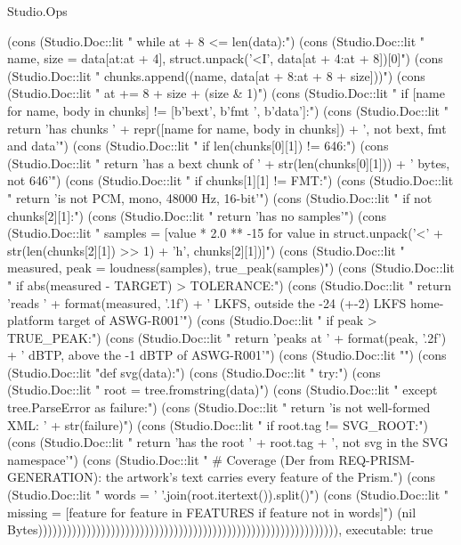 \begin{lexlean}{Studio.Ops}
\begin{semanticmodule}
{{    (cons (Studio.Doc::lit "    while at + 8 <= len(data):\n")
    (cons (Studio.Doc::lit "        name, size = data[at:at + 4], struct.unpack('<I', data[at + 4:at + 8])[0]\n")
    (cons (Studio.Doc::lit "        chunks.append((name, data[at + 8:at + 8 + size]))\n")
    (cons (Studio.Doc::lit "        at += 8 + size + (size & 1)\n")
    (cons (Studio.Doc::lit "    if [name for name, body in chunks] != [b'bext', b'fmt ', b'data']:\n")
    (cons (Studio.Doc::lit "        return 'has chunks ' + repr([name for name, body in chunks]) + ', not bext, fmt and data'\n")
    (cons (Studio.Doc::lit "    if len(chunks[0][1]) != 646:\n")
    (cons (Studio.Doc::lit "        return 'has a bext chunk of ' + str(len(chunks[0][1])) + ' bytes, not 646'\n")
    (cons (Studio.Doc::lit "    if chunks[1][1] != FMT:\n")
    (cons (Studio.Doc::lit "        return 'is not PCM, mono, 48000 Hz, 16-bit'\n")
    (cons (Studio.Doc::lit "    if not chunks[2][1]:\n")
    (cons (Studio.Doc::lit "        return 'has no samples'\n")
    (cons (Studio.Doc::lit "    samples = [value * 2.0 ** -15 for value in struct.unpack('<' + str(len(chunks[2][1]) >> 1) + 'h', chunks[2][1])]\n")
    (cons (Studio.Doc::lit "    measured, peak = loudness(samples), true_peak(samples)\n")
    (cons (Studio.Doc::lit "    if abs(measured - TARGET) > TOLERANCE:\n")
    (cons (Studio.Doc::lit "        return 'reads ' + format(measured, '.1f') + ' LKFS, outside the -24 (+-2) LKFS home-platform target of ASWG-R001'\n")
    (cons (Studio.Doc::lit "    if peak > TRUE_PEAK:\n")
    (cons (Studio.Doc::lit "        return 'peaks at ' + format(peak, '.2f') + ' dBTP, above the -1 dBTP of ASWG-R001'\n")
    (cons (Studio.Doc::lit "\n")
    (cons (Studio.Doc::lit "def svg(data):\n")
    (cons (Studio.Doc::lit "    try:\n")
    (cons (Studio.Doc::lit "        root = tree.fromstring(data)\n")
    (cons (Studio.Doc::lit "    except tree.ParseError as failure:\n")
    (cons (Studio.Doc::lit "        return 'is not well-formed XML: ' + str(failure)\n")
    (cons (Studio.Doc::lit "    if root.tag != SVG_ROOT:\n")
    (cons (Studio.Doc::lit "        return 'has the root ' + root.tag + ', not svg in the SVG namespace'\n")
    (cons (Studio.Doc::lit "    # Coverage (Der from REQ-PRISM-GENERATION): the artwork's text carries every feature of the Prism.\n")
    (cons (Studio.Doc::lit "    words = ' '.join(root.itertext()).split()\n")
    (cons (Studio.Doc::lit "    missing = [feature for feature in FEATURES if feature not in words]\n")
    (nil Bytes)))))))))))))))))))))))))))))))))))))))))))))))))))))))))))))),
  executable: true
}

}
\end{semanticmodule}
\end{lexlean}
